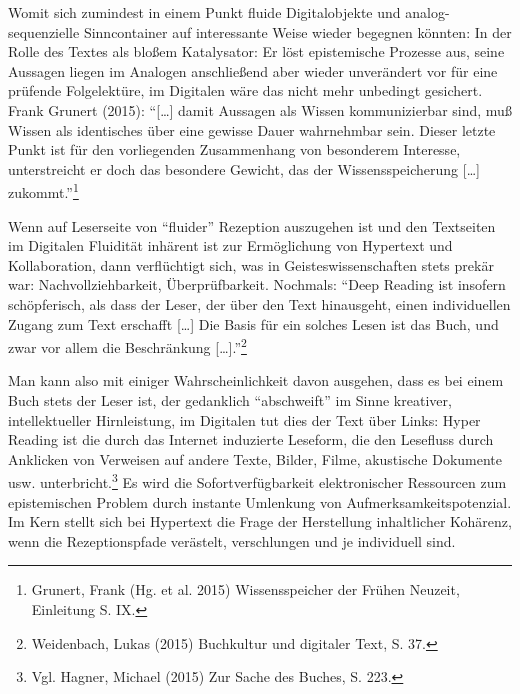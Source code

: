 \documentclass[a4paper,
fontsize=11pt,
oneside,
numbers=noperiodatend,
parskip=half-,
bibliography=totoc,
final
]{scrartcl}
\begin{document}
Womit sich zumindest in einem Punkt fluide Digitalobjekte und
analog-sequenzielle Sinncontainer auf interessante Weise wieder begegnen
könnten: In der Rolle des Textes als bloßem Katalysator: Er löst
epistemische Prozesse aus, seine Aussagen liegen im Analogen
anschließend aber wieder unverändert vor für eine prüfende Folgelektüre,
im Digitalen wäre das nicht mehr unbedingt gesichert. Frank Grunert
(2015): \enquote{{[}\ldots{}{]} damit Aussagen als Wissen kommunizierbar
sind, muß Wissen als identisches über eine gewisse Dauer wahrnehmbar
sein. Dieser letzte Punkt ist für den vorliegenden Zusammenhang von
besonderem Interesse, unterstreicht er doch das besondere Gewicht, das
der Wissensspeicherung {[}\ldots{}{]} zukommt.}\footnote{Grunert, Frank
  (Hg. et al. 2015) Wissensspeicher der Frühen Neuzeit, Einleitung S.
  IX.}

Wenn auf Leserseite von \enquote{fluider} Rezeption auszugehen ist und
den Textseiten im Digitalen Fluidität inhärent ist zur Ermöglichung von
Hypertext und Kollaboration, dann verflüchtigt sich, was in
Geisteswissenschaften stets prekär war: Nachvollziehbarkeit,
Überprüfbarkeit. Nochmals: \enquote{Deep Reading ist insofern
schöpferisch, als dass der Leser, der über den Text hinausgeht, einen
individuellen Zugang zum Text erschafft {[}\ldots{}{]} Die Basis für ein
solches Lesen ist das Buch, und zwar vor allem die Beschränkung
{[}\ldots{}{]}.}\footnote{Weidenbach, Lukas (2015) Buchkultur und
  digitaler Text, S. 37.}

Man kann also mit einiger Wahrscheinlichkeit davon ausgehen, dass es bei
einem Buch stets der Leser ist, der gedanklich \enquote{abschweift} im
Sinne kreativer, intellektueller Hirnleistung, im Digitalen tut dies der
Text über Links: Hyper Reading ist die durch das Internet induzierte
Leseform, die den Lesefluss durch Anklicken von Verweisen auf andere
Texte, Bilder, Filme, akustische Dokumente usw. unterbricht.\footnote{Vgl.
  Hagner, Michael (2015) Zur Sache des Buches, S. 223.} Es wird die
Sofortverfügbarkeit elektronischer Ressourcen zum epistemischen Problem
durch instante Umlenkung von Aufmerksamkeitspotenzial. Im Kern stellt
sich bei Hypertext die Frage der Herstellung inhaltlicher Kohärenz, wenn
die Rezeptionspfade verästelt, verschlungen und je individuell sind.
\end{document}
